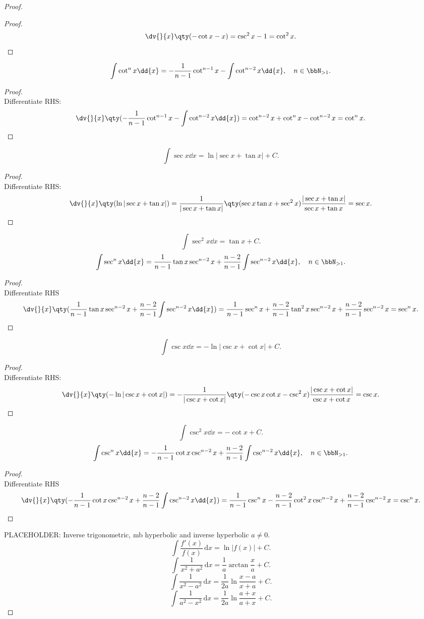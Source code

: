 \documentclass[a4paper,12pt]{report}
\begin{document}
\begin{itemize}
\begin{itemize}
\begin{proof}
\begin{proof}
    \[\dv{}{x}\qty(-\cot x-x)=\csc^2 x-1=\cot^2x.\]
\end{proof}
\[\int\cot^n x\dd{x}=-\frac{1}{n-1}\cot^{n-1}x-\int\cot^{n-2}x\dd{x},\quad n\in\bbN_{>1}.\]
\begin{proof}\mbox{}\\
    Differentiate RHS:
    \[\dv{}{x}\qty(-\frac{1}{n-1}\cot^{n-1}x-\int\cot^{n-2}x\dd{x})=\cot^{n-2}x+\cot^nx-\cot^{n-2}x=\cot^n x.\]
\end{proof}
\[\int\sec x\dd{x}=\ln|\sec x+\tan x|+C.\]
\begin{proof}\mbox{}\\
    Differentiate RHS:
    \[\dv{}{x}\qty(\ln|\sec x+\tan x|)=\frac{1}{|\sec x+\tan x|}\qty(\sec x\tan x+\sec^2 x)\frac{|\sec x+\tan x|}{\sec x+\tan x}=\sec x.\]
\end{proof}
\[\int\sec^2 x\dd{x}=\tan x+C.\]
\[\int\sec^n x\dd{x}=\frac{1}{n-1}\tan x\sec^{n-2}x+\frac{n-2}{n-1}\int\sec^{n-2}x\dd{x},\quad n\in\bbN_{>1}.\]
\begin{proof}\mbox{}\\
    Differentiate RHS
    \[\dv{}{x}\qty(\frac{1}{n-1}\tan x\sec^{n-2}x+\frac{n-2}{n-1}\int\sec^{n-2}x\dd{x})=\frac{1}{n-1}\sec^nx+\frac{n-2}{n-1}\tan^2x\sec^{n-2}x+\frac{n-2}{n-1}\sec^{n-2}x=\sec^n x.\]
\end{proof}
\[\int\csc x\dd{x}=-\ln|\csc x+\cot x|+C.\]
\begin{proof}\mbox{}\\
    Differentiate RHS:
    \[\dv{}{x}\qty(-\ln|\csc x+\cot x|)=-\frac{1}{|\csc x+\cot x|}\qty(-\csc x\cot x-\csc^2 x)\frac{|\csc x+\cot x|}{\csc x+\cot x}=\csc x.\]
\end{proof}
\[\int\csc^2 x\dd{x}=-\cot x+C.\]
\[\int\csc^n x\dd{x}=-\frac{1}{n-1}\cot x\csc^{n-2}x+\frac{n-2}{n-1}\int\csc^{n-2}x\dd{x},\quad n\in\bbN_{>1}.\]
\begin{proof}\mbox{}\\
    Differentiate RHS
    \[\dv{}{x}\qty(-\frac{1}{n-1}\cot x\csc^{n-2}x+\frac{n-2}{n-1}\int\csc^{n-2}x\dd{x})=\frac{1}{n-1}\csc^nx-\frac{n-2}{n-1}\cot^2x\csc^{n-2}x+\frac{n-2}{n-1}\csc^{n-2}x=\csc^nx.\]
\end{proof}
PLACEHOLDER: Inverse trigonometric, mb hyperbolic and inverse hyperbolic
$a\neq 0$.
\[\int\frac{f'(x)}{f(x)}\,\mathrm{d}x=\ln|f(x)|+C.\]
\[\int\frac{1}{x^2+a^2}\,\mathrm{d}x=\frac{1}{a}\arctan\frac{x}{a}+C.\]
\[\int\frac{1}{x^2-a^2}\,\mathrm{d}x=\frac{1}{2a}\ln\frac{x-a}{x+a}+C.\]
\[\int\frac{1}{a^2-x^2}\,\mathrm{d}x=\frac{1}{2a}\ln\frac{a+x}{a+x}+C.\]

\end{proof}
\end{itemize}
\end{itemize}
\end{document}
